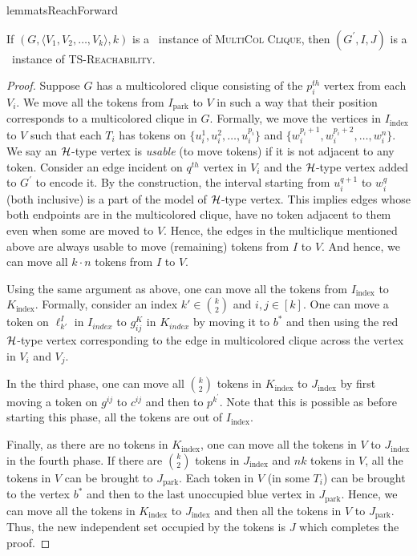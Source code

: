 \begin{restatable}{lemma}{tsReachForward}
\label{lemma:forward-reduction-leafage-TS-Reach}

If $(G,\langle V_1,V_2,\ldots,V_k\rangle, k)$ is a \yes\ instance of \textsc{MultiCol Clique},
then $(G^\prime, I, J)$ is a \yes\ instance of \textsc{TS-Reachability}.
\end{restatable}
\begin{proof}
Suppose $G$ has a multicolored clique consisting of the $p_i^{th}$
vertex from each $V_i$.
We move all the tokens from $I_{\text{park}}$
to $V$ in such a way that their position corresponds to
a multicolored clique in $G$.
Formally, we move the vertices in $I_\text{index}$ to $V$ such that each
$T_i$ has tokens on $\{u_i^1,u_i^2,\ldots,u_i^{p_i}\}$ and
$\{w_i^{p_i+1},w_i^{p_i+2},\ldots,w_i^n\}$.
We say an ${\mathcal H}$-type vertex is \emph{usable} (to move tokens)
if it is not adjacent to any token.
Consider an edge incident on $q^{th}$ vertex in $V_i$
and the ${\mathcal H}$-type vertex added to $G^{\prime}$ to encode it.
By the construction, the interval starting from $u_i^{q+1}$ to $w_i^q$
(both inclusive) is a part of the model of ${\mathcal H}$-type vertex.
This implies edges whose both endpoints are in the multicolored clique,
have no token adjacent to them even when some are moved to $V$.
Hence, the edges in the multiclique mentioned above
are always usable to move (remaining) tokens from $I$ to $V$.
And hence, we can move all $k \cdot n$ tokens from $I$ to $V$.

Using the same argument as above,
one can move all the tokens from $I_{\text{index}}$ to $K_{\text{index}}$.
Formally, consider an index $k' \in \binom{k}{2}$ and $i, j \in [k]$.
One can move a token on $\ell_{k'}^I$ in $I_{index}$
to $g_{ij}^K$ in $K_{index}$ by moving it to $b^*$
and then using the red ${\mathcal H}$-type vertex corresponding to
the edge in multicolored clique across the vertex in $V_i$ and $V_j$.

In the third phase, one can move all ${k}\choose{2}$ tokens in
$K_\text{index}$ to $J_\text{index}$ by first moving a token
on $g^{ij}$ to $c^{ij}$ and then to $p^{k^\prime}$.
Note that this is possible as before starting this phase,
all the tokens are out of $I_{\text{index}}$.

Finally, as there are no tokens in $K_{\text{index}}$,
one can move all the tokens in $V$ to $J_{\text{index}}$
in the fourth phase.
If there are ${k}\choose{2}$ tokens in $J_\text{index}$ and
$nk$ tokens in $V$, all the tokens in $V$ can be brought to $J_\text{park}$.
Each token in $V$ (in some $T_i$) can be brought to the vertex
$b^*$ and then to the last unoccupied blue vertex in $J_\text{park}$.
Hence, we can move all the tokens in $K_{\text{index}}$ to $J_{\text{index}}$
and then all the tokens in $V$ to $J_{\text{park}}$.
Thus, the new independent set occupied by the tokens is $J$
which completes the proof.
\end{proof}

